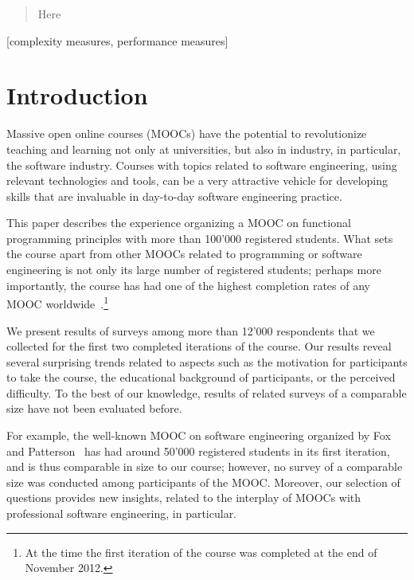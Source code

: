 \documentclass{sig-alternate}
\begin{document}
\maketitle
\begin{abstract}
Here
\end{abstract}

[complexity measures, performance measures]



\section{Introduction}

Massive open online courses (MOOCs) have the potential to revolutionize teaching
and learning not only at
universities, but also in industry, in particular, the software industry.
Courses with topics related to software engineering, using relevant
technologies and tools, can be a very attractive vehicle for developing skills
that are invaluable in day-to-day software engineering practice.

This paper describes the experience organizing a MOOC on functional
programming principles with more than 100'000 registered students. What sets
the course apart from other MOOCs related to programming or software
engineering is not only its large number of registered students; perhaps more
importantly, the course has had one of the highest completion rates of any
MOOC worldwide~\cite{Parr13}.\footnote{At the time the first iteration of the
course was completed at the end of November 2012.}

We present results of surveys among more than 12'000 respondents that we
collected for the first two completed iterations of the course. Our results
reveal several surprising trends related to aspects such as the motivation for
participants to take the course, the educational background of participants,
or the perceived difficulty. To the best of our knowledge, results of related
surveys of a comparable size have not been evaluated before.

For example, the well-known MOOC on software engineering organized by Fox and
Patterson~\cite{FoxP12} has had around 50'000 registered students in its first
iteration, and is thus comparable in size to our course; however, no survey of
a comparable size was conducted among participants of the MOOC. Moreover, our
selection of questions provides new insights, related to the interplay of
MOOCs with professional software engineering, in particular.
\end{document}
